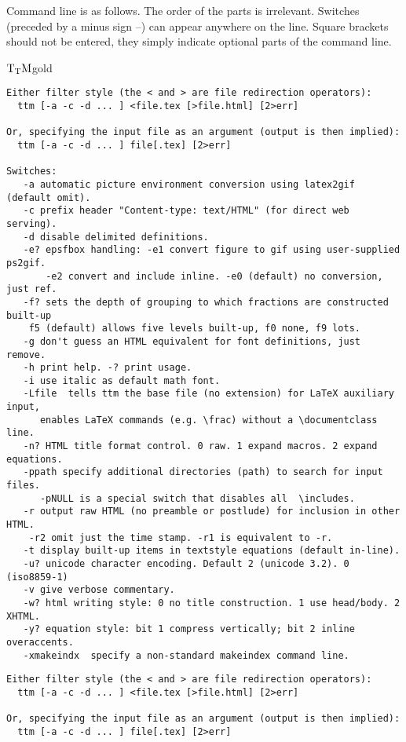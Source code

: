 \documentclass[12pt]{article}
\def\ttmdump{}
\def\TtM{$\rm{}T_TH$}
\def\TtM{$\rm{}T_TM$}%
\def\TtMgold{\TtM{}gold}
\begin{document}
\index{switches!\TtM} Command line is as
follows. The order of the parts is irrelevant. Switches (preceded by a
minus sign --) can appear anywhere on the line. Square brackets should
not be entered, they simply indicate optional parts of the command
line.\label{n-switch}
 { \ttmdump{\small}
\ifx\TtMgold\undefined
\begin{verbatim}
Either filter style (the < and > are file redirection operators):
  ttm [-a -c -d ... ] <file.tex [>file.html] [2>err]

Or, specifying the input file as an argument (output is then implied):
  ttm [-a -c -d ... ] file[.tex] [2>err]

Switches:
   -a automatic picture environment conversion using latex2gif (default omit). 
   -c prefix header "Content-type: text/HTML" (for direct web serving).
   -d disable delimited definitions.
   -e? epsfbox handling: -e1 convert figure to gif using user-supplied ps2gif.
       -e2 convert and include inline. -e0 (default) no conversion, just ref. 
   -f? sets the depth of grouping to which fractions are constructed built-up
    f5 (default) allows five levels built-up, f0 none, f9 lots. 
   -g don't guess an HTML equivalent for font definitions, just remove.
   -h print help. -? print usage.
   -i use italic as default math font.
   -Lfile  tells ttm the base file (no extension) for LaTeX auxiliary input, 
      enables LaTeX commands (e.g. \frac) without a \documentclass line.
   -n? HTML title format control. 0 raw. 1 expand macros. 2 expand equations.
   -ppath specify additional directories (path) to search for input files.
      -pNULL is a special switch that disables all  \includes.
   -r output raw HTML (no preamble or postlude) for inclusion in other HTML.
	-r2 omit just the time stamp. -r1 is equivalent to -r.
   -t display built-up items in textstyle equations (default in-line).
   -u? unicode character encoding. Default 2 (unicode 3.2). 0 (iso8859-1)
   -v give verbose commentary. 
   -w? html writing style: 0 no title construction. 1 use head/body. 2 XHTML.
   -y? equation style: bit 1 compress vertically; bit 2 inline overaccents.
   -xmakeindx  specify a non-standard makeindex command line.
\end{verbatim}
\else
\begin{verbatim}
Either filter style (the < and > are file redirection operators):
  ttm [-a -c -d ... ] <file.tex [>file.html] [2>err]

Or, specifying the input file as an argument (output is then implied):
  ttm [-a -c -d ... ] file[.tex] [2>err]


\end{verbatim}}
\end{document}
